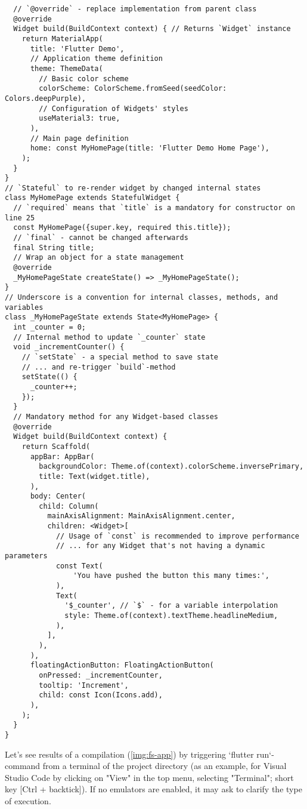 \begin{lstlisting}
  // `@override` - replace implementation from parent class
  @override
  Widget build(BuildContext context) { // Returns `Widget` instance
    return MaterialApp(
      title: 'Flutter Demo',
      // Application theme definition
      theme: ThemeData(
        // Basic color scheme
        colorScheme: ColorScheme.fromSeed(seedColor: Colors.deepPurple),
        // Configuration of Widgets' styles
        useMaterial3: true,
      ),
      // Main page definition
      home: const MyHomePage(title: 'Flutter Demo Home Page'),
    );
  }
}
// `Stateful` to re-render widget by changed internal states
class MyHomePage extends StatefulWidget {
  // `required` means that `title` is a mandatory for constructor on line 25
  const MyHomePage({super.key, required this.title});
  // `final` - cannot be changed afterwards
  final String title;
  // Wrap an object for a state management
  @override
  _MyHomePageState createState() => _MyHomePageState();
}
// Underscore is a convention for internal classes, methods, and variables
class _MyHomePageState extends State<MyHomePage> {
  int _counter = 0;
  // Internal method to update `_counter` state
  void _incrementCounter() {
    // `setState` - a special method to save state
    // ... and re-trigger `build`-method
    setState(() {
      _counter++;
    });
  }
  // Mandatory method for any Widget-based classes
  @override
  Widget build(BuildContext context) {
    return Scaffold(
      appBar: AppBar(
        backgroundColor: Theme.of(context).colorScheme.inversePrimary,
        title: Text(widget.title),
      ),
      body: Center(
        child: Column(
          mainAxisAlignment: MainAxisAlignment.center,
          children: <Widget>[
            // Usage of `const` is recommended to improve performance
            // ... for any Widget that's not having a dynamic parameters
            const Text(
                'You have pushed the button this many times:',
            ),
            Text(
              '$_counter', // `$` - for a variable interpolation
              style: Theme.of(context).textTheme.headlineMedium,
            ),
          ],
        ),
      ),
      floatingActionButton: FloatingActionButton(
        onPressed: _incrementCounter,
        tooltip: 'Increment',
        child: const Icon(Icons.add),
      ),
    );
  }
}
\end{lstlisting}

Let's see results of a compilation (\cref{img:fs-app}) by triggering `flutter run`-command from a terminal of the 
project directory (as an example, for Visual Studio Code by clicking on "View" in the top menu, selecting "Terminal"; 
short key [Ctrl + backtick]). If no emulators are enabled, it may ask to clarify the type of execution.

